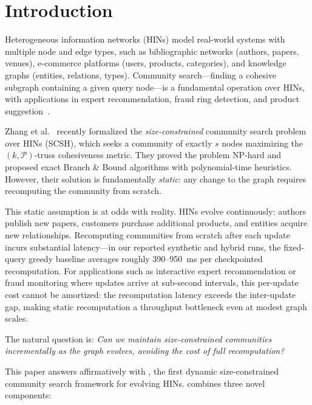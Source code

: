 \section{Introduction}

Heterogeneous information networks (HINs) model real-world systems with multiple node and edge types, such as bibliographic networks (authors, papers, venues), e-commerce platforms (users, products, categories), and knowledge graphs (entities, relations, types). Community search---finding a cohesive subgraph containing a given query node---is a fundamental operation over HINs, with applications in expert recommendation, fraud ring detection, and product suggestion~\cite{zhang2025scsh,sach2024icde}.

Zhang et al.~\cite{zhang2025scsh} recently formalized the \emph{size-constrained} community search problem over HINs (SCSH), which seeks a community of exactly $s$ nodes maximizing the $(k,\mathcal{P})$-truss cohesiveness metric. They proved the problem NP-hard and proposed exact Branch \& Bound algorithms with polynomial-time heuristics. However, their solution is fundamentally \emph{static}: any change to the graph requires recomputing the community from scratch.

This static assumption is at odds with reality. HINs evolve continuously: authors publish new papers, customers purchase additional products, and entities acquire new relationships. Recomputing communities from scratch after each update incurs substantial latency---in our reported synthetic and hybrid runs, the fixed-query greedy baseline averages roughly 390--950~ms per checkpointed recomputation. For applications such as interactive expert recommendation or fraud monitoring where updates arrive at sub-second intervals, this per-update cost cannot be amortized: the recomputation latency exceeds the inter-update gap, making static recomputation a throughput bottleneck even at modest graph scales.

The natural question is: \emph{Can we maintain size-constrained communities incrementally as the graph evolves, avoiding the cost of full recomputation?}

This paper answers affirmatively with \textbf{\DynaSCSH}, the first dynamic size-constrained community search framework for evolving HINs. \DynaSCSH combines three novel components:

